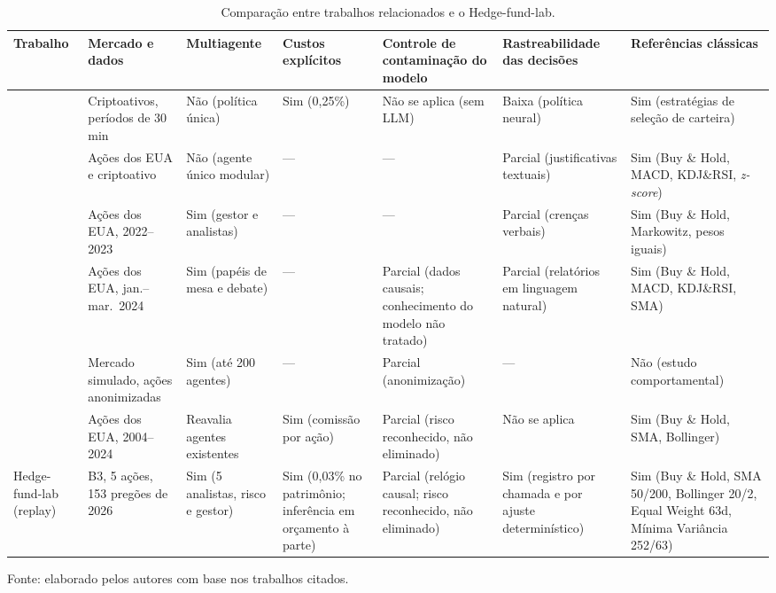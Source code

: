 \begin{table}[H]
\centering
\caption{Comparação entre trabalhos relacionados e o Hedge-fund-lab.}
\label{tab:relacionados}
\footnotesize
\setlength{\tabcolsep}{3pt}
\begin{tabular}{>{\raggedright\arraybackslash}p{1.9cm} >{\raggedright\arraybackslash}p{2.2cm} >{\raggedright\arraybackslash}p{1.8cm} >{\raggedright\arraybackslash}p{1.6cm} >{\raggedright\arraybackslash}p{2.4cm} >{\raggedright\arraybackslash}p{2.0cm} >{\raggedright\arraybackslash}p{2.4cm}}
\toprule
\textbf{Trabalho} & \textbf{Mercado e dados} & \textbf{Multi\-agente} & \textbf{Custos explícitos} & \textbf{Controle de contaminação do modelo} & \textbf{Rastrea\-bilidade das decisões} & \textbf{Referências clássicas} \\
\midrule
\citet{Jiang2017} & Criptoativos, períodos de 30 min & Não (política única) & Sim (0,25\%) & Não se aplica (sem LLM) & Baixa (política neural) & Sim (estratégias de seleção de carteira) \\
\addlinespace
\citet{FinAgent2024} & Ações dos EUA e criptoativo & Não (agente único modular) & --- & --- & Parcial (justificativas textuais) & Sim (Buy \& Hold, MACD, KDJ\&RSI, \textit{z-score}) \\
\addlinespace
\citet{FinCon2024} & Ações dos EUA, 2022--2023 & Sim (gestor e analistas) & --- & --- & Parcial (crenças verbais) & Sim (Buy \& Hold, Markowitz, pesos iguais) \\
\addlinespace
\citet{TradingAgents2024} & Ações dos EUA, jan.--mar.\ 2024 & Sim (papéis de mesa e debate) & --- & Parcial (dados causais; conhecimento do modelo não tratado) & Parcial (relatórios em linguagem natural) & Sim (Buy \& Hold, MACD, KDJ\&RSI, SMA) \\
\addlinespace
\citet{StockAgent2024} & Mercado simulado, ações anonimizadas & Sim (até 200 agentes) & --- & Parcial (anonimização) & --- & Não (estudo comportamental) \\
\addlinespace
\citet{FINSABER2026} & Ações dos EUA, 2004--2024 & Reavalia agentes existentes & Sim (comissão por ação) & Parcial (risco reconhecido, não eliminado) & Não se aplica & Sim (Buy \& Hold, SMA, Bollinger) \\
\addlinespace
Hedge-fund-lab (replay) & B3, 5 ações, 153 pregões de 2026 & Sim (5 analistas, risco e gestor) & Sim (0,03\% no patrimônio; inferência em orçamento à parte) & Parcial (relógio causal; risco reconhecido, não eliminado) & Sim (registro por chamada e por ajuste determinístico) & Sim (Buy \& Hold, SMA 50/200, Bollinger 20/2, Equal Weight 63d, Mínima Variância 252/63) \\
\bottomrule
\end{tabular}

\vspace{2pt}
{\footnotesize Fonte: elaborado pelos autores com base nos trabalhos citados.}
\end{table}


